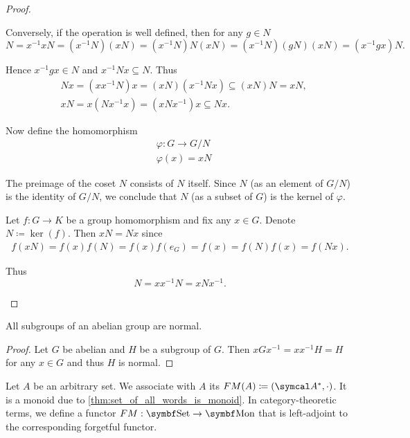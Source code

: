 \begin{proof}
\begin{description}
    Conversely, if the operation is well defined, then for any \( g \in N \)
    \begin{equation*}
      N = x^{-1} x N = (x^{-1} N) (x N) = (x^{-1} N) N (x N) = (x^{-1} N) (g N) (x N) = (x^{-1} g x) N.
    \end{equation*}

    Hence \( x^{-1} g x \in N \) and \( x^{-1} N x \subseteq N \). Thus
    \begin{align*}
      &Nx = (x x^{-1} N)x = (xN) (x^{-1} N x) \subseteq (xN) N = xN,
      \\
      &xN = x(N x^{-1} x) = (x N x^{-1}) x \subseteq Nx.
    \end{align*}

    Now define the homomorphism
    \begin{align*}
      &\varphi: G \to G / N \\
      &\varphi(x) = xN
    \end{align*}

    The preimage of the coset \( N \) consists of \( N \) itself. Since \( N \) (as an element of \( G / N \)) is the identity of \( G / N \), we conclude that \( N \) (as a subset of \( G \)) is the kernel of \( \varphi \).

     Let \( f: G \to K \) be a group homomorphism and fix any \( x \in G \). Denote \( N \coloneqq \ker(f) \). Then \( xN = Nx \) since
    \begin{align*}
      f(xN)
      =
      f(x) f(N)
      =
      f(x) f(e_G)
      =
      f(x)
      =
      f(N) f(x)
      =
      f(Nx).
    \end{align*}

    Thus
    \begin{equation*}
      N = xx^{-1}N = xNx^{-1}.
    \end{equation*}
  \end{description}
\end{proof}

\begin{proposition}\label{thm:abelian_normal_subgroups}
  All subgroups of an abelian group are normal.
\end{proposition}
\begin{proof}
  Let \( G \) be abelian and \( H \) be a subgroup of \( G \). Then \( xGx^{-1} = xx^{-1}H = H \) for any \( x \in G \) and thus \( H \) is normal.
\end{proof}

\begin{definition}\label{def:free_monoid}\cite[306]{Knapp2016BAlg}
  Let \( A \) be an arbitrary set. We associate with \( A \) its  \( FM(A) \coloneqq (\Cal{A}^{*}, \cdot) \). It is a monoid due to \cref{thm:set_of_all_words_is_monoid}. In category-theoretic terms, we define a functor \( FM: \Cat{Set} \to \Cat{Mon} \) that is left-adjoint to the corresponding forgetful functor.
\end{definition}

